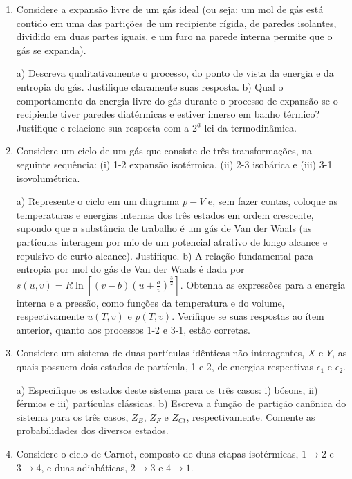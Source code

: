 \begin{enumerate}[start=1,label={\bfseries Q\arabic*.}]
\item Considere a expansão livre de um gás ideal (ou seja: um mol de gás está contido em uma das partições de um recipiente rígida, de paredes isolantes, dividido em duas partes iguais, e um furo na parede interna permite que o gás se expanda).

  a) Descreva qualitativamente o processo, do ponto de vista da energia e da entropia do gás. Justifique claramente suas resposta.
  b) Qual o comportamento da energia livre do gás durante o processo de expansão se o recipiente tiver paredes diatérmicas e estiver imerso em banho térmico? Justifique e relacione sua resposta com a $2^{\underline{a}}$ lei da termodinâmica.




\item Considere um ciclo de um gás que consiste de três transformações, na seguinte sequência: (i) 1-2 expansão isotérmica, (ii) 2-3 isobárica e (iii) 3-1 isovolumétrica.

  a) Represente o ciclo em um diagrama $p-V$ e, sem fazer contas, coloque as temperaturas e energias internas dos três estados em ordem crescente, supondo que a substância de trabalho é um gás de Van der Waals (as partículas interagem por mio de um potencial atrativo de longo alcance e repulsivo de curto alcance). Justifique.
  b) A relação fundamental para entropia por mol do gás de Van der Waals é dada por $s(u,v) = R \operatorname{ln} \left[ \left(v - b \right) \left( u + \frac{a}{v} \right)^{\frac{3}{2}} \right]$. Obtenha as expressões para a energia interna e a pressão, como funções da temperatura e do volume, respectivamente $u(T,v)$ e $p(T,v)$. Verifique se suas respostas ao ítem anterior, quanto aos processos 1-2 e 3-1, estão corretas.




\item Considere um sistema de duas partículas idênticas não interagentes, $X$ e $Y$, as quais possuem dois estados de partícula, 1 e 2, de energias respectivas $\epsilon_{1}$ e $\epsilon_{2}$.

  a) Especifique os estados deste sistema para os três casos: i) bósons, ii) férmios e iii) partículas clássicas.
  b) Escreva a função de partição canônica do sistema para os três casos, $Z_{B}$, $Z_{F}$ e $Z_{Ct}$, respectivamente. Comente as probabilidades dos diversos estados.





\item Considere o ciclo de Carnot, composto de duas etapas isotérmicas, $1 \rightarrow 2$ e $3 \rightarrow 4$, e duas adiabáticas, $2 \rightarrow 3$ e $4 \rightarrow 1$.


\end{enumerate}
